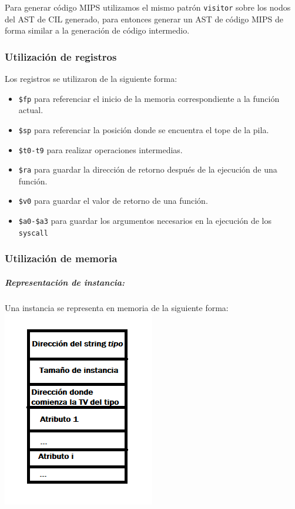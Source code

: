 \documentclass[a4paper,10pt,twocolumn]{article}
\begin{document}
Para generar código MIPS utilizamos el mismo patrón \lstinline|visitor| sobre los nodos del AST de CIL generado, para entonces generar un AST de código MIPS de forma similar a la generación de código intermedio. 

\subsubsection{Utilización de registros}
Los registros se utilizaron de la siguiente forma:
\begin{itemize}
	\item \lstinline|$fp| para referenciar el inicio de la memoria correspondiente a la función actual.
	\item \lstinline|$sp| para referenciar la posición donde se encuentra el tope de la pila. 
	\item \lstinline|$t0-t9| para realizar operaciones intermedias. 
	\item \lstinline|$ra| para guardar la dirección de retorno después de la ejecución de una función. 
	\item \lstinline|$v0| para guardar el valor de retorno de una función. 
	\item \lstinline|$a0-$a3| para guardar los argumentos necesarios en la ejecución de los \lstinline|syscall|
\end{itemize}

\subsubsection{Utilización de memoria}

\subparagraph{Representación de instancia:}
	Una instancia se representa en memoria de la siguiente forma:
	\includegraphics[scale=0.7]{Instancia.png}
\end{document}
